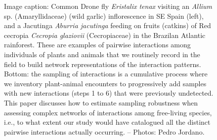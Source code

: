 \documentclass[a4paper,12pt]{article}
\begin{document}
\begin{figure}
  \caption{Image caption: Common Drone fly \textit{Eristalix tenax} visiting an \textit{Allium} sp. (Amaryllidaceae) (wild garlic) inflorescence in SE Spain (left), and a Jacutinga \textit{Aburria jacutinga} feeding on fruits (catkins) of Red cecropia \textit{Cecropia glaziovii} (Cecropiaceae) in the Brazilan Atlantic rainforest. These are examples of pairwise interactions among individuals of plants and animals that we routinely record in the field to build network representations of the interaction patterns. Bottom: the sampling of interactions is a cumulative process where we inventory plant-animal encounters to progressively add samples with new interactions (steps 1 to 6) that were previously undetected. This paper discusses how to estimate sampling robustness when assessing complex networks of interactions among free-living species, i.e., to what extent our study would have catalogued all the distinct pairwise interactions actually occurring. – Photos: Pedro Jordano.}
  \label{Fig_laysumm}
\end{figure}
\end{document}
